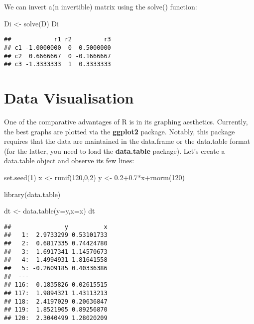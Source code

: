\documentclass[
  oneside]{book}
\newenvironment{Shaded}{\begin{snugshade}}{\end{snugshade}}
\newcommand{\AttributeTok}[1]{\textcolor[rgb]{0.77,0.63,0.00}{#1}}
\newcommand{\DecValTok}[1]{\textcolor[rgb]{0.00,0.00,0.81}{#1}}
\newcommand{\FloatTok}[1]{\textcolor[rgb]{0.00,0.00,0.81}{#1}}
\newcommand{\FunctionTok}[1]{\textcolor[rgb]{0.00,0.00,0.00}{#1}}
\newcommand{\NormalTok}[1]{#1}
\newcommand{\OtherTok}[1]{\textcolor[rgb]{0.56,0.35,0.01}{#1}}
\newcommand{\SpecialCharTok}[1]{\textcolor[rgb]{0.00,0.00,0.00}{#1}}
\begin{document}
We can invert a(n invertible) matrix using the solve() function:

\begin{Shaded}
\begin{Highlighting}[]
\NormalTok{Di }\OtherTok{\textless{}{-}} \FunctionTok{solve}\NormalTok{(D)}
\NormalTok{Di}
\end{Highlighting}
\end{Shaded}

\begin{verbatim}
##            r1 r2         r3
## c1 -1.0000000  0  0.5000000
## c2  0.6666667  0 -0.1666667
## c3 -1.3333333  1  0.3333333
\end{verbatim}

\hypertarget{data-visualisation}{%
\section*{Data Visualisation}\label{data-visualisation}}

One of the comparative advantages of R is in its graphing aesthetics. Currently, the best graphs are plotted via the \textbf{ggplot2} package. Notably, this package requires that the data are maintained in the data.frame or the data.table format (for the latter, you need to load the \textbf{data.table} package). Let's create a data.table object and observe its few lines:

\begin{Shaded}
\begin{Highlighting}[]
\FunctionTok{set.seed}\NormalTok{(}\DecValTok{1}\NormalTok{)}
\NormalTok{x }\OtherTok{\textless{}{-}} \FunctionTok{runif}\NormalTok{(}\DecValTok{120}\NormalTok{,}\DecValTok{0}\NormalTok{,}\DecValTok{2}\NormalTok{)}
\NormalTok{y }\OtherTok{\textless{}{-}} \FloatTok{0.2+0.7}\SpecialCharTok{*}\NormalTok{x}\SpecialCharTok{+}\FunctionTok{rnorm}\NormalTok{(}\DecValTok{120}\NormalTok{)}

\FunctionTok{library}\NormalTok{(data.table)}

\NormalTok{dt }\OtherTok{\textless{}{-}} \FunctionTok{data.table}\NormalTok{(}\AttributeTok{y=}\NormalTok{y,}\AttributeTok{x=}\NormalTok{x)}
\NormalTok{dt}
\end{Highlighting}
\end{Shaded}

\begin{verbatim}
##               y          x
##   1:  2.9733299 0.53101733
##   2:  0.6817335 0.74424780
##   3:  1.6917341 1.14570673
##   4:  1.4994931 1.81641558
##   5: -0.2609185 0.40336386
##  ---                      
## 116:  0.1835826 0.02615515
## 117:  1.9894321 1.43113213
## 118:  2.4197029 0.20636847
## 119:  1.8521905 0.89256870
## 120:  2.3040499 1.28020209
\end{verbatim}
\end{document}
